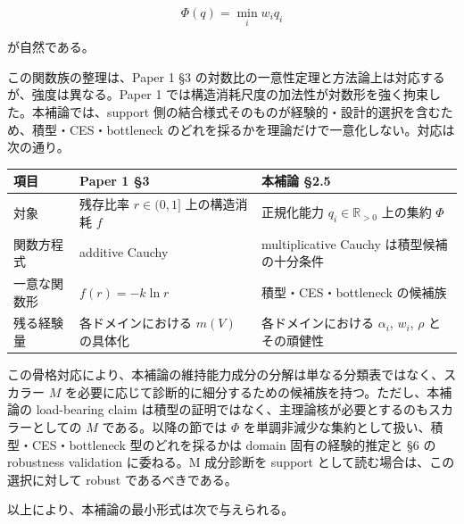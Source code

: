 \documentclass[12pt,a4paper]{article}
\begin{document}
\[
\Phi(q)=\min_{i} w_{i} q_{i}
\]

が自然である。

この関数族の整理は、Paper 1 §3 の対数比の一意性定理と方法論上は対応するが、強度は異なる。Paper 1 では構造消耗尺度の加法性が対数形を強く拘束した。本補論では、support 側の結合様式そのものが経験的・設計的選択を含むため、積型・CES・bottleneck のどれを採るかを理論だけで一意化しない。対応は次の通り。

{\def\LTcaptype{table} %
\begin{longtable}[]{@{}
  >{\raggedright\arraybackslash}p{}
  >{\raggedright\arraybackslash}p{}
  >{\raggedright\arraybackslash}p{}@{}}
\toprule\noalign{}
\begin{minipage}[b]{\linewidth}\raggedright
項目
\end{minipage} & \begin{minipage}[b]{\linewidth}\raggedright
Paper 1 §3
\end{minipage} & \begin{minipage}[b]{\linewidth}\raggedright
本補論 §2.5
\end{minipage} \\
\midrule\noalign{}
\endhead
\bottomrule\noalign{}
\endlastfoot
対象 & 残存比率 \(r \in (0,1]\) 上の構造消耗 \(f\) & 正規化能力 \(q_i \in \mathbb{R}_{>0}\) 上の集約 \(\Phi\) \\
関数方程式 & additive Cauchy & multiplicative Cauchy は積型候補の十分条件 \\
一意な関数形 & \(f(r) = -k \ln r\) & 積型・CES・bottleneck の候補族 \\
残る経験量 & 各ドメインにおける \(m(V)\) の具体化 & 各ドメインにおける \(\alpha_i\), \(w_i\), \(\rho\) とその頑健性 \\
\end{longtable}
}

この骨格対応により、本補論の維持能力成分の分解は単なる分類表ではなく、スカラー \(M\) を必要に応じて診断的に細分するための候補族を持つ。ただし、本補論の load-bearing claim は積型の証明ではなく、主理論核が必要とするのもスカラーとしての \(M\) である。以降の節では \(\Phi\) を単調非減少な集約として扱い、積型・CES・bottleneck 型のどれを採るかは domain 固有の経験的推定と §6 の robustness validation に委ねる。M 成分診断を support として読む場合は、この選択に対して robust であるべきである。

以上により、本補論の最小形式は次で与えられる。
\end{document}
